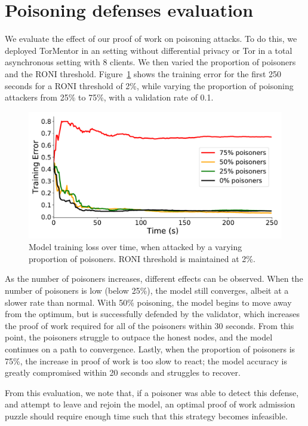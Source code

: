 \section{Poisoning defenses evaluation}
\label{eval:poisoning}

We evaluate the effect of our proof of work on poisoning attacks. To
do this, we deployed TorMentor in an setting without differential
privacy or Tor in a total asynchronous setting with 8 clients. We
then varied the proportion of poisoners and the RONI threshold.
Figure~\ref{fig:poison} shows the training error for the first 250
seconds for a RONI threshold of 2\%, while varying the proportion of
poisoning attackers from 25\% to 75\%, with a validation rate of 0.1.

\begin{figure}[t]
	\includegraphics[width=\linewidth]{fig/poison}
	\caption{Model training loss over time, when attacked by a varying
	proportion of poisoners. RONI threshold is maintained at 2\%.}
	\label{fig:poison}
\end{figure}

As the number of poisoners increases, different effects can be
observed. When the number of poisoners is low (below 25\%), the model
still converges, albeit at a slower rate than normal. With 50\%
poisoning, the model begins to move away from the optimum, but is
successfully defended by the validator, which increases the proof of
work required for all of the poisoners within 30 seconds. From this
point, the poisoners struggle to outpace the honest nodes, and the model
continues on a path to convergence. Lastly, when the proportion of
poisoners is 75\%, the increase in proof of work is too slow to
react; the model accuracy is greatly compromised within 20 seconds and
struggles to recover.

From this evaluation, we note that, if a poisoner was able to detect
this defense, and attempt to leave and rejoin the model, an optimal
proof of work admission puzzle should require enough time such that
this strategy becomes infeasible.

